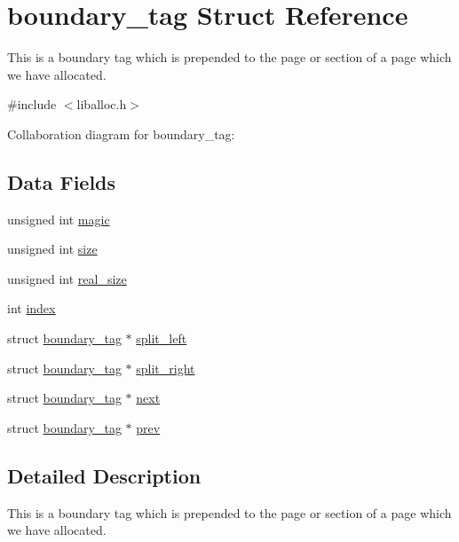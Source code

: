 \hypertarget{a00126}{}\section{boundary\+\_\+tag Struct Reference}
\label{a00126}


This is a boundary tag which is prepended to the page or section of a page which we have allocated.  




{\ttfamily \#include $<$liballoc.\+h$>$}



Collaboration diagram for boundary\+\_\+tag\+:
\subsection*{Data Fields}
\begin{DoxyCompactItemize}
\item 
unsigned int \hyperlink{a00126_a96a8bec3c60c81b8c41239169ec70b6c_a96a8bec3c60c81b8c41239169ec70b6c}{magic}
\item 
unsigned int \hyperlink{a00126_a29b056a39f6022d32468e7913e6df936_a29b056a39f6022d32468e7913e6df936}{size}
\item 
unsigned int \hyperlink{a00126_ad22b1c69bdce419783ac165f7f354245_ad22b1c69bdce419783ac165f7f354245}{real\+\_\+size}
\item 
int \hyperlink{a00126_adfc426eed5361508d62c6e8f484bd270_adfc426eed5361508d62c6e8f484bd270}{index}
\item 
struct \hyperlink{a00126}{boundary\+\_\+tag} $\ast$ \hyperlink{a00126_a4daa8c3768359ea8d0f46ef907616cc2_a4daa8c3768359ea8d0f46ef907616cc2}{split\+\_\+left}
\item 
struct \hyperlink{a00126}{boundary\+\_\+tag} $\ast$ \hyperlink{a00126_a9d43c9c4ff5ae35908dcfed0aec1907a_a9d43c9c4ff5ae35908dcfed0aec1907a}{split\+\_\+right}
\item 
struct \hyperlink{a00126}{boundary\+\_\+tag} $\ast$ \hyperlink{a00126_a123f0bd815d7fda9f535b031640662fc_a123f0bd815d7fda9f535b031640662fc}{next}
\item 
struct \hyperlink{a00126}{boundary\+\_\+tag} $\ast$ \hyperlink{a00126_af5e6f310850e847ad873773f9ab8b902_af5e6f310850e847ad873773f9ab8b902}{prev}
\end{DoxyCompactItemize}


\subsection{Detailed Description}
This is a boundary tag which is prepended to the page or section of a page which we have allocated. 

